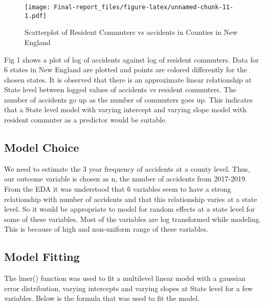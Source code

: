 \documentclass[
]{article}
\begin{document}
\begin{figure}
\centering
\texttt{[image: Final-report\_files/figure-latex/unnamed-chunk-11-1.pdf]}
\caption{Scatterplot of Resident Commuters vs accidents in Counties in
New England}
\end{figure}

Fig 1 shows a plot of log of accidents against log of resident
commuters. Data for 6 states in New England are plotted and points are
colored differently for the chosen states. It is observed that there is
an approximate linear relationship at State level between logged values
of accidents vs resident commuters. The number of accidents go up as the
number of commuters goes up. This indicates that a State level model
with varying intercept and varying slope model with resident commuter as
a predictor would be suitable.

\hypertarget{model-choice}{%
\subsection{Model Choice}\label{model-choice}}

We need to estimate the 3 year frequency of accidents at a county level.
Thus, our outcome variable is chosen as n, the number of accidents from
2017-2019. From the EDA it was understood that 6 variables seem to have
a strong relationship with number of accidents and that this
relationship varies at a state level. So it would be appropriate to
model for random effects at a state level for some of these variables.
Most of the variables are log transformed while modeling. This is
because of high and non-uniform range of these variables.

\hypertarget{model-fitting}{%
\subsection{Model Fitting}\label{model-fitting}}

The lmer() function was used to fit a multilevel linear model with a
gaussian error distribution, varying intercepts and varying slopes at
State level for a few variables. Below is the formula that was used to
fit the model.
\end{document}
